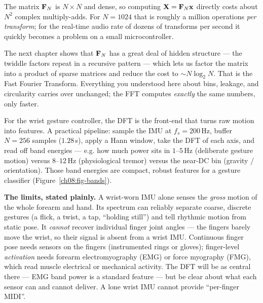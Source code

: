 The matrix $\mathbf{F}_N$ is $N\times N$ and dense, so computing $\mathbf{X} =
\mathbf{F}_N\mathbf{x}$ directly costs about $N^2$ complex multiply-adds. For $N=1024$
that is roughly a million operations \emph{per transform}; for the real-time
audio rate of dozens of transforms per second it quickly becomes a problem on a
small microcontroller.

The next chapter shows that $\mathbf{F}_N$ has a great deal of hidden structure --- the
twiddle factors repeat in a recursive pattern --- which lets us factor the matrix
into a product of sparse matrices and reduce the cost to $\sim N\log_2 N$.
That is the Fast Fourier Transform. Everything you understood here about bins,
leakage, and circularity carries over unchanged; the FFT computes \emph{exactly}
the same numbers, only faster.

\begin{goalbox}
For the wrist gesture controller, the DFT is the front-end that turns raw motion
into features. A practical pipeline: sample the IMU at $f_s = 200$\,Hz, buffer
$N=256$ samples ($1.28$\,s), apply a Hann window, take the DFT of each axis, and
read off band energies --- e.g. how much power sits in $1$--$5$\,Hz (deliberate
gesture motion) versus $8$--$12$\,Hz (physiological tremor) versus the near-DC bin
(gravity / orientation). Those band energies are compact, robust features for a
gesture classifier (Figure~\ref{ch08:fig-bands}).

\textbf{The limits, stated plainly.} A wrist-worn IMU alone senses the \emph{gross} motion of
the whole forearm and hand. Its spectrum can reliably separate coarse, discrete
gestures (a flick, a twist, a tap, ``holding still'') and tell rhythmic motion
from static pose. It \emph{cannot} recover individual finger joint angles --- the
fingers barely move the wrist, so their signal is absent from a wrist
IMU. Continuous finger pose needs sensors on the fingers (instrumented rings or
gloves); finger-level \emph{activation} needs forearm electromyography (EMG) or force myography (FMG),
which read muscle electrical or mechanical activity. The DFT will be as
central there --- EMG band power is a standard feature --- but be clear about
what each sensor can and cannot deliver. A lone wrist IMU cannot provide ``per-finger
MIDI''.


\end{goalbox}
